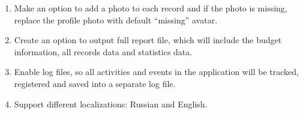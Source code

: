 \documentclass{article}
\begin{document}
\begin{enumerate}
\item Make an option to add a photo to each record and if the photo is missing, replace the profile photo with default “missing” avatar.

\item Create an option to output full report file, which will include the budget information, all records data and statistics data.

\item Enable log files, so all activities and events in the application will be tracked, registered and saved into a separate log file.

\item Support different localizations: Russian and English.
  
  \end{enumerate}

  
\end{document}
